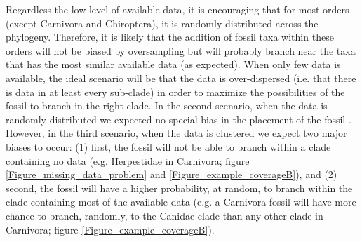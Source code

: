 \documentclass[12pt,letterpaper]{article}
\renewcommand{\subsection}[1]{%
\bigskip
\begin{center}
\begin{large}
\normalfont\itshape #1
\end{large}
\end{center}}
\begin{document}
Regardless the low level of available data, it is encouraging that for most orders (except Carnivora and Chiroptera), it is randomly distributed across the phylogeny. Therefore, it is likely that the addition of fossil taxa within these orders will not be biased by oversampling but will probably branch near the taxa that has the most similar available data (as expected). When only few data is available, the ideal scenario will be that the data is over-dispersed (i.e. that there is data in at least every sub-clade) in order to maximize the possibilities of the fossil to branch in the right clade. In the second scenario, when the data is randomly distributed we expected no special bias in the placement of the fossil \cite{GuillermeCooper}. However, in the third scenario, when the data is clustered we expect two major biases to occur: (1) first, the fossil will not be able to branch within a clade containing no data (e.g. Herpestidae in Carnivora; figure \ref{Figure_missing_data_problem} and \ref{Figure_example_coverageB}), and (2) second, the fossil will have a higher probability, at random, to branch within the clade containing most of the available data (e.g. a Carnivora fossil will have more chance to branch, randomly, to the Canidae clade than any other clade in Carnivora; figure \ref{Figure_example_coverageB}).

\end{document}
